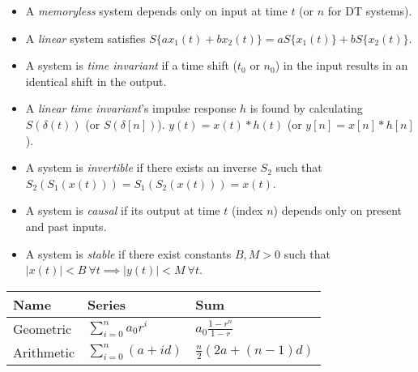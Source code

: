 \documentclass[8pt]{article}
\begin{document}
\begin{itemize}
    \item A \emph{memoryless} system depends only on input at time
          \( t \) (or \( n \) for DT systems).
    \item A \emph{linear} system satisfies
          \(S\{a x_1(t) + b x_2(t)\} = a S\{x_1(t)\} + b S\{x_2(t)\}.\)
    \item A system is \emph{time invariant} if a time shift (\(t_0\) or \(n_0\)) in the input results in
          an identical shift in the output.
    \item A \emph{linear time invariant}'s impulse response \(h\) is found by calculating
          \(S(\delta(t))\) (or \(S(\delta[n])\)). \(y(t) = x(t) * h(t)\) (or \(y[n] = x[n] * h[n]\)).
    \item A system is \emph{invertible} if there exists
          an inverse \( S_2 \) such that
          \(S_2(S_1(x(t))) = S_1(S_2(x(t))) = x(t)\).
    \item A system is \emph{causal} if its output at time \( t \) (index \(n\)) depends
          only on present and past inputs.
    \item A system is \emph{stable} if there exist constants \( B, M > 0 \)
          such that
          \(|x(t)| < B \ \forall t \implies |y(t)| < M \ \forall t\).
\end{itemize}

\begin{table}[]
    \begin{tabular}{l|l|l}
        Name       & Series                   & Sum                           \\
        \hline
        Geometric  & $\sum_{i=0}^{n} a_0 r^i$ & $a_0 \frac{1 - r^n}{1 - r}$   \\
        \hline
        Arithmetic & $\sum_{i=0}^{n} (a+id)$  & $\frac{n}{2} (2a + (n - 1)d)$
    \end{tabular}
\end{table}
\end{document}
